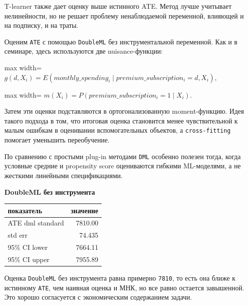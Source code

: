 \documentclass[11pt]{article}
\newcounter{none}
\begin{document}
    T-learner также дает оценку выше истинного ATE. Метод лучше учитывает
нелинейности, но не решает проблему ненаблюдаемой переменной, влияющей и
на подписку, и на траты.

    Оценим \texttt{ATE} с помощью \texttt{DoubleML} без инструментальной
переменной. Как и в семинаре, здесь используются две nuisance-функции:

\begin{center}
\begin{adjustbox}{max width=\linewidth}
\(\displaystyle g(d, X_i) = E(monthly\_spending_i \mid premium\_subscription_i = d, X_i),\)
\end{adjustbox}
\end{center}

\begin{center}
\begin{adjustbox}{max width=\linewidth}
\(\displaystyle m(X_i) = P(premium\_subscription_i = 1 \mid X_i).\)
\end{adjustbox}
\end{center}

Затем эти оценки подставляются в ортогонализованную moment-функцию. Идея
такого подхода в том, что итоговая оценка становится менее
чувствительной к малым ошибкам в оценивании вспомогательных объектов, а
\texttt{cross-fitting} помогает уменьшить переобучение.

По сравнению с простыми plug-in методами \texttt{DML} особенно полезен
тогда, когда условные средние и propensity score оцениваются гибкими
ML-моделями, а не жесткими линейными спецификациями.

    \textbf{DoubleML без инструмента}

{\def\LTcaptype{none} %
\begin{longtable}[]{@{}lr@{}}
\toprule\noalign{}
показатель & значение \\
\midrule\noalign{}
\endhead
\bottomrule\noalign{}
\endlastfoot
ATE dml standard & 7810.00 \\
std err & 74.435 \\
95\% CI lower & 7664.11 \\
95\% CI upper & 7955.89 \\
\end{longtable}
}

    Оценка \texttt{DoubleML} без инструмента равна примерно \texttt{7810},
то есть она ближе к истинному \texttt{ATE}, чем наивная оценка и МНК, но
все равно остается завышенной. Это хорошо согласуется с экономическим
содержанием задачи.
\end{document}
